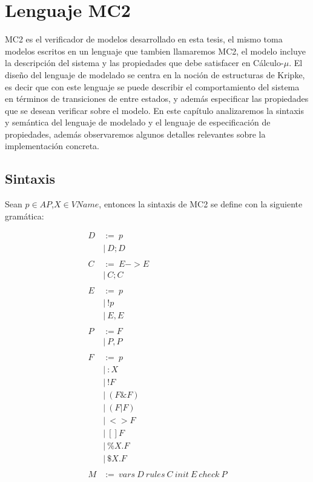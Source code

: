 \chapter{Lenguaje MC2}

MC2 es el verificador de modelos desarrollado en esta tesis, el mismo toma modelos escritos en un lenguaje que tambien llamaremos MC2, el modelo incluye la descripción del sistema y las propiedades que debe satisfacer en Cálculo-$\mu$. El diseño del lenguaje de modelado se centra en la noción de estructuras de Kripke, es decir que con este lenguaje se puede describir el comportamiento del sistema en términos de transiciones de entre estados, y además especificar las propiedades que se desean verificar sobre el modelo. En este capítulo analizaremos la sintaxis y semántica del lenguaje de modelado y el lenguaje de especificación de propiedades, además observaremos algunos detalles relevantes sobre la implementación concreta.

\section{Sintaxis}
Sean $p \in AP$,$X \in VName$, entonces la sintaxis de MC2 se define con la siguiente gramática:

\begin{align*}
D &:=\ p \\
   &|\ D;D \\
\\
C &:=\ E->E \\
   &|\ C;C \\
\\
E &:=\ p \\
   &|\ !p \\
   &|\ E,E \\
\\
P &:= F \\
   &|\ P,P \\
\\
F &:=\ p \\
   &|\ :X \\
   &|\ !F \\
   &|\ (F \& F) \\
   &|\ (F | F) \\
   &|\ <>F \\
   &|\ []F \\
   &|\ \%X.F \\
   &|\ \$X.F \\ 
\\
M &:=\ vars\ D\ rules\ C\ init\ E\ check\ P \\
\end{align*}

